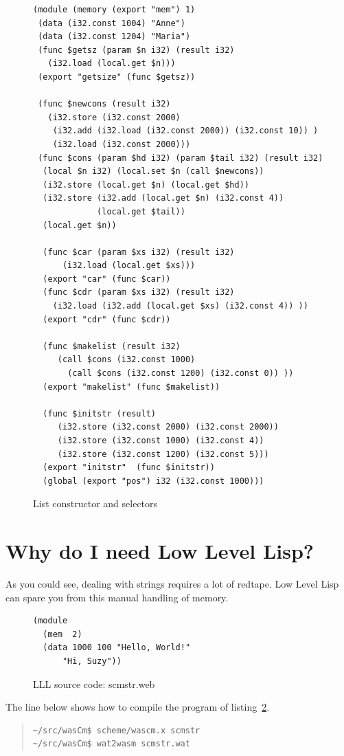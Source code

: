 \documentclass[a4paper,12pt]{book}
\begin{document}
\begin{figure}[!t]
  \begin{verbatim}
(module (memory (export "mem") 1)
 (data (i32.const 1004) "Anne")
 (data (i32.const 1204) "Maria")
 (func $getsz (param $n i32) (result i32)
   (i32.load (local.get $n)))
 (export "getsize" (func $getsz))
  
 (func $newcons (result i32)
   (i32.store (i32.const 2000)
    (i32.add (i32.load (i32.const 2000)) (i32.const 10)) )
    (i32.load (i32.const 2000))) 
 (func $cons (param $hd i32) (param $tail i32) (result i32)
  (local $n i32) (local.set $n (call $newcons))
  (i32.store (local.get $n) (local.get $hd))
  (i32.store (i32.add (local.get $n) (i32.const 4))
             (local.get $tail))
  (local.get $n))

  (func $car (param $xs i32) (result i32)
      (i32.load (local.get $xs)))
  (export "car" (func $car))
  (func $cdr (param $xs i32) (result i32)
    (i32.load (i32.add (local.get $xs) (i32.const 4)) ))
  (export "cdr" (func $cdr))

  (func $makelist (result i32)
     (call $cons (i32.const 1000)
       (call $cons (i32.const 1200) (i32.const 0)) ))
  (export "makelist" (func $makelist))

  (func $initstr (result)
     (i32.store (i32.const 2000) (i32.const 2000))
     (i32.store (i32.const 1000) (i32.const 4))
     (i32.store (i32.const 1200) (i32.const 5)))
  (export "initstr"  (func $initstr))
  (global (export "pos") i32 (i32.const 1000)))
  \end{verbatim}
  \caption{List constructor and selectors}
  \label{wasm:cons}
\end{figure}


\section{Why do I need Low Level Lisp?}
As you could see, dealing with strings requires
a lot of redtape. Low Level Lisp can spare
you from this manual handling of memory.

\begin{figure}[!h]
\begin{verbatim}
(module
  (mem  2)
  (data 1000 100 "Hello, World!"
      "Hi, Suzy"))
\end{verbatim}
\caption{LLL source code: scmstr.web}
\label{wasm:scmstr.web}  
\end{figure}

The line below shows how to compile the
program of listing~\ref{wasm:scmstr.web}.
\begin{quote}
\begin{verbatim}
~/src/wasCm$ scheme/wascm.x scmstr
~/src/wasCm$ wat2wasm scmstr.wat
\end{verbatim}
\end{quote}
\end{document}
